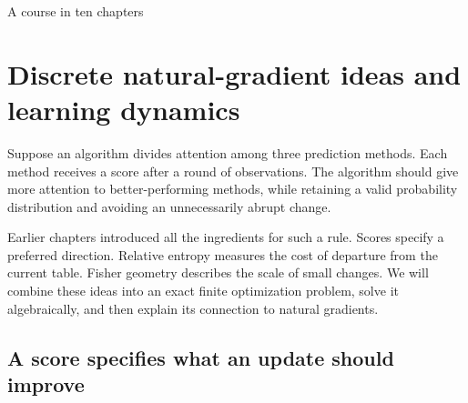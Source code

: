 \documentclass[11pt,oneside,openany]{book}
\theoremstyle{definition}
\theoremstyle{remark}
\numberwithin{equation}{chapter}
\begin{document}
\begin{titlepage}\color{ink}\centering\vspace*{1.0in}{\small\sffamily PROBABILITY AND MATHEMATICAL MODELLING\par}\vspace{.45in}{\Huge\bfseries Discrete Information\\[.12in]Geometry\par}\vspace{.35in}{\Large Finite Differences, Probability,\\and Information Flows\par}\vspace{1cm}{\Large Chapter 9\par}\vfill{}\vfill{\large A course in ten chapters\par}\end{titlepage}
\setcounter{chapter}{8}

\chapter{Discrete natural-gradient ideas and learning dynamics}
Suppose an algorithm divides attention among three prediction methods. Each method receives a score after a round of observations. The algorithm should give more attention to better-performing methods, while retaining a valid probability distribution and avoiding an unnecessarily abrupt change.

Earlier chapters introduced all the ingredients for such a rule. Scores specify a preferred direction. Relative entropy measures the cost of departure from the current table. Fisher geometry describes the scale of small changes. We will combine these ideas into an exact finite optimization problem, solve it algebraically, and then explain its connection to natural gradients.

\section{A score specifies what an update should improve}\label{ch09-a-score-specifies-what-an-update-should-improve}
\end{document}
